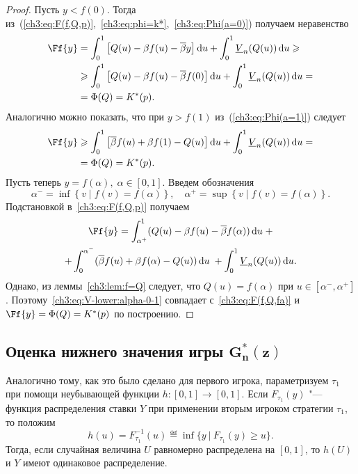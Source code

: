 {\begin{proof}
  Пусть $y < f(0)$.
  Тогда из~(\ref{ch3:eq:F(f,Q,p)},~\ref{ch3:eq:phi=k*},~\ref{ch3:eq:Phi(a=0)}) получаем неравенство
  \begin{align*}
    \Ff{y} 
    &= \int_0^1 \left[ 
      Q(u) - \Co f(u) - \DCo y 
    \right] \di u +
    \int_0^1 \LV{n}(Q(u)) \di u \geq \\
    &\geq \int_0^1 \left[ 
      Q(u) - \Co f(u) - \DCo f(0) 
    \right] \di u + \int_0^1 \LV{n}(Q(u)) \di u = \\
    &= \Phi(Q) = K^*(p).
  \end{align*}
  Аналогично можно показать, что при $y > f(1)$ из~(\ref{ch3:eq:Phi(a=1)}) следует
  \begin{align*}
    \Ff{y} 
    &\geq \int_0^1 \left[ 
      \DCo f(u) + \Co f(1) - Q(u) 
    \right] \di u + \int_0^1 \LV{n}(Q(u)) \di u = \\
    &= \Phi(Q) = K^*(p).
  \end{align*}
  Пусть теперь $y = f(\alpha), \; \alpha \in [0, 1]$. Введем обозначения
  \[
    \alpha^- = \inf \left\{ v \;|\; f(v) = f(\alpha) \right\}, \quad \alpha^+ =
    \sup \left\{ v \;|\; f(v) = f(\alpha) \right\}.
  \]
  Подстановкой в~\eqref{ch3:eq:F(f,Q,p)} получаем
  \begin{multline}\label{ch3:eq:V-lower:alpha-0-1}
    \Ff{y} =
    \int_{\alpha^+}^1  (Q(u) - \Co f(u) - \DCo f(\alpha)) \di u \; + \\
    + \int_0^{\alpha^-} (\DCo f(u) + \Co f(\alpha) - Q(u)) \di u \; + \int_0^1
    \LV{n}(Q(u)) \di u.
  \end{multline}
  Однако, из леммы~\ref{ch3:lem:f=Q} следует, что $Q(u) = f(\alpha)$ при $u \in [\alpha^-, \alpha^+]$.
  Поэтому~\eqref{ch3:eq:V-lower:alpha-0-1} совпадает с~\eqref{ch3:eq:F(f,Q,fa)} и $\Ff{y} = \Phi(Q) = K^*(p)$ по построению.
\end{proof}

\subsection{Оценка нижнего значения игры $\mathbf{G^*_n(z)}$}
\label{ch3:sec:-dual-game}

Аналогично тому, как это было сделано для первого игрока, параметризуем $\tau_1$ при помощи неубывающей функции $h: [0, 1] \rightarrow [0, 1]$.
Если $F_{\tau_1}(y)$ "--- функция распределения ставки $Y$ при применении вторым игроком стратегии $\tau_1$, то положим
\begin{equation*}
  h(u) = F^{-1}_{\tau_1}(u) \eqdef \inf \{ y\ |\ F_{\tau_1}(y) \geq u \}.
\end{equation*}
Тогда, если случайная величина $U$ равномерно распределена на $[0, 1]$, то $h(U)$ и $Y$ имеют одинаковое распределение.

}
